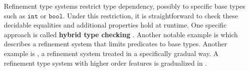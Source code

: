 Refinement type systems restrict type dependency, possibly to specific base types such as $\mathtt{int}$ or $\mathtt{bool}$.
Under this restriction, it is straightforward to check these decidable equalities and additional properties hold at runtime.
One specific approach is called \textbf{hybrid type checking} \cite{10.1145/1111037.1111059}.
Another notable example is \cite{10.1007/1-4020-8141-3_34} which describes a refinement system that limits predicates to base types.
Another example is \cite{10.1145/3093333.3009856}, a refinement system treated in a specifically gradual way.
A refinement type system with higher order features is gradualized in \cite{c4be73a0daf74c9aa4d13483a2c4dd0e}.
 
 
 
 
